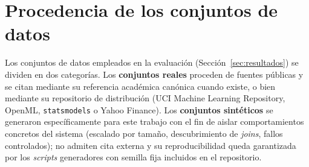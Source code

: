 \section{Procedencia de los conjuntos de datos}
\label{anexo:datasets}

Los conjuntos de datos empleados en la evaluación (Sección~\ref{sec:resultados})
se dividen en dos categorías. Los \textbf{conjuntos reales} proceden de fuentes
públicas y se citan mediante su referencia académica canónica cuando existe, o bien
mediante su repositorio de distribución (UCI Machine Learning Repository, OpenML,
\texttt{statsmodels} o Yahoo Finance). Los \textbf{conjuntos sintéticos} se generaron
específicamente para este trabajo con el fin de aislar comportamientos concretos del
sistema (escalado por tamaño, descubrimiento de \textit{joins}, fallos controlados);
no admiten cita externa y su reproducibilidad queda garantizada por los \textit{scripts}
generadores con semilla fija incluidos en el repositorio.

